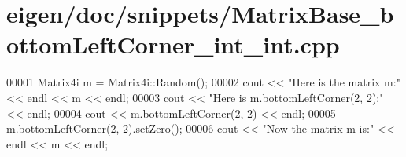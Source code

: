 \hypertarget{eigen_2doc_2snippets_2_matrix_base__bottom_left_corner__int__int_8cpp_source}{}\section{eigen/doc/snippets/\+Matrix\+Base\+\_\+bottom\+Left\+Corner\+\_\+int\+\_\+int.cpp}
\label{eigen_2doc_2snippets_2_matrix_base__bottom_left_corner__int__int_8cpp_source}

\begin{DoxyCode}
00001 Matrix4i m = Matrix4i::Random();
00002 cout << \textcolor{stringliteral}{"Here is the matrix m:"} << endl << m << endl;
00003 cout << \textcolor{stringliteral}{"Here is m.bottomLeftCorner(2, 2):"} << endl;
00004 cout << m.bottomLeftCorner(2, 2) << endl;
00005 m.bottomLeftCorner(2, 2).setZero();
00006 cout << \textcolor{stringliteral}{"Now the matrix m is:"} << endl << m << endl;
\end{DoxyCode}
